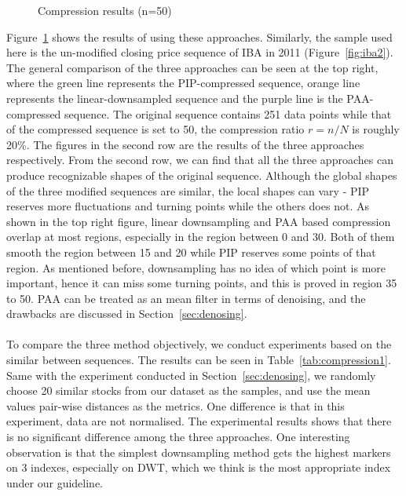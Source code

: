 \begin{figure}[!htbp]
    \centering 
    \caption{ Compression results (n=50) } 
    \label{fig:compression2} 
\end{figure} 
Figure~\ref{fig:compression2} shows the results of using these approaches. Similarly, the sample used here is the un-modified closing price sequence of IBA in 2011 (Figure~\ref{fig:iba2}). The general comparison of the three approaches can be seen at the top right, where the green line represents the PIP-compressed sequence, orange line represents the linear-downsampled sequence and the purple line is the PAA-compressed sequence. The original sequence contains 251 data points while that of the compressed sequence is set to 50, the compression ratio $r=n/N$ is roughly 20\%. The figures in the second row are the results of the three approaches respectively. From the second row, we can find that all the three approaches can produce recognizable shapes of the original sequence. Although the global shapes of the three modified sequences are similar, the local shapes can vary - PIP reserves more fluctuations and turning points while the others does not.
As shown in the top right figure, linear downsampling and PAA based compression overlap at most regions, especially in the region between 0 and 30. Both of them smooth the region between 15 and 20 while PIP reserves some points of that region. As mentioned before, downsampling has no idea of which point is more important, hence it can miss some turning points, and this is proved in region 35 to 50. PAA can be treated as an mean filter in terms of denoising, and the drawbacks are discussed in Section~\ref{sec:denosing}. \\
\\To compare the three method objectively, we conduct experiments based on the similar between sequences. The results can be seen in Table~\ref{tab:compression1}. Same with the experiment conducted in Section~\ref{sec:denosing}, we randomly choose 20 similar stocks from our dataset as the samples, and use the mean values pair-wise distances as the metrics. One difference is that in this experiment, data are not normalised. The experimental results shows that there is no significant difference among the three approaches. One interesting observation is that the simplest downsampling method gets the highest markers on 3 indexes, especially on DWT, which we think is the most appropriate index under our guideline. 
